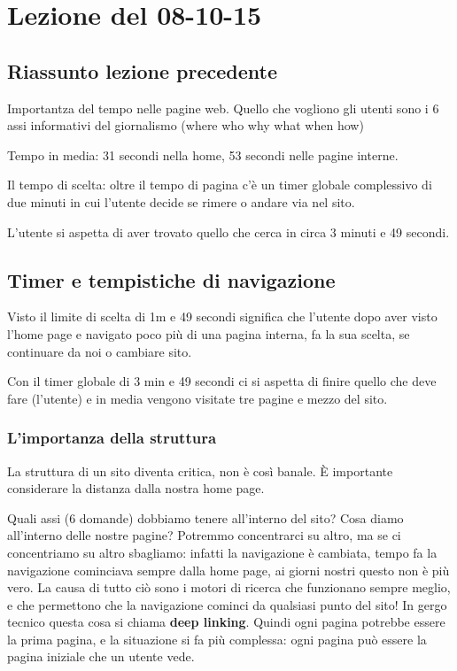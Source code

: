 \section{Lezione del 08-10-15}

\subsection{Riassunto lezione precedente}
Importantza del tempo nelle pagine web. Quello che vogliono gli utenti sono i 6 assi informativi del giornalismo (where who why what when how)

Tempo in media: 31 secondi nella home, 53 secondi nelle pagine interne.

Il tempo di scelta: oltre il tempo di pagina c'\`e un timer globale complessivo di due minuti in cui l'utente decide se rimere o andare via nel sito.

L'utente si aspetta di aver trovato quello che cerca in circa 3 minuti e 49 secondi.

\subsection{Timer e tempistiche di navigazione}

Visto il limite di scelta di 1m e 49 secondi significa che l'utente dopo aver visto l'home page e navigato poco pi\`u di una pagina interna, fa la sua scelta, se continuare da noi o cambiare sito.

Con il timer globale di 3 min e 49 secondi ci si aspetta di finire quello che deve fare (l'utente) e in media vengono visitate tre pagine e mezzo del sito.

\subsubsection{L'importanza della struttura}

La struttura di un sito diventa critica, non \`e cos\`i banale. \`E importante considerare la distanza dalla nostra home page.

Quali assi (6 domande) dobbiamo tenere all'interno del sito? Cosa diamo all'interno delle nostre pagine? Potremmo concentrarci su altro, ma se ci concentriamo su altro sbagliamo: infatti la navigazione \`e cambiata, tempo fa la navigazione cominciava sempre dalla home page, ai giorni nostri questo non \`e pi\`u vero. La causa di tutto ci\`o sono i motori di ricerca che funzionano sempre meglio, e che permettono che la navigazione cominci da qualsiasi punto del sito! In gergo tecnico questa cosa si chiama \textbf{deep linking}. Quindi ogni pagina potrebbe essere la prima pagina, e la situazione si fa pi\`u complessa: ogni pagina pu\`o essere la pagina iniziale che un utente vede.

